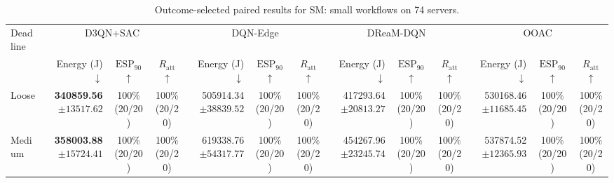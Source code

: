 \begin{table}[!t]
\centering
\caption{Outcome-selected paired results for SM: small workflows on 74 servers.}
\label{tab:conditional_case_sm}
\begingroup
\footnotesize
\setlength{\tabcolsep}{2.2pt}
\renewcommand{\arraystretch}{1.08}
\begin{tabular}{@{}l*{4}{rcc}@{}}
\toprule
Deadline & \multicolumn{3}{c}{D3QN+SAC} & \multicolumn{3}{c}{DQN-Edge} & \multicolumn{3}{c}{DReaM-DQN} & \multicolumn{3}{c}{OOAC} \\
\cmidrule(lr){2-4}\cmidrule(lr){5-7}\cmidrule(lr){8-10}\cmidrule(lr){11-13}
 & Energy (J) $\downarrow$ & $\mathrm{ESP}_{90}$ $\uparrow$ & $R_{\mathrm{att}}$ $\uparrow$ & Energy (J) $\downarrow$ & $\mathrm{ESP}_{90}$ $\uparrow$ & $R_{\mathrm{att}}$ $\uparrow$ & Energy (J) $\downarrow$ & $\mathrm{ESP}_{90}$ $\uparrow$ & $R_{\mathrm{att}}$ $\uparrow$ & Energy (J) $\downarrow$ & $\mathrm{ESP}_{90}$ $\uparrow$ & $R_{\mathrm{att}}$ $\uparrow$ \\
\midrule
Loose & \shortstack[r]{\textbf{340859.56}\\$\pm 13517.62$} & \shortstack[c]{100\%\\(20/20)} & \shortstack[c]{100\%\\(20/20)} & \shortstack[r]{505914.34\\$\pm 38839.52$} & \shortstack[c]{100\%\\(20/20)} & \shortstack[c]{100\%\\(20/20)} & \shortstack[r]{417293.64\\$\pm 20813.27$} & \shortstack[c]{100\%\\(20/20)} & \shortstack[c]{100\%\\(20/20)} & \shortstack[r]{530168.46\\$\pm 11685.45$} & \shortstack[c]{100\%\\(20/20)} & \shortstack[c]{100\%\\(20/20)} \\
Medium & \shortstack[r]{\textbf{358003.88}\\$\pm 15724.41$} & \shortstack[c]{100\%\\(20/20)} & \shortstack[c]{100\%\\(20/20)} & \shortstack[r]{619338.76\\$\pm 54317.77$} & \shortstack[c]{100\%\\(20/20)} & \shortstack[c]{100\%\\(20/20)} & \shortstack[r]{454267.96\\$\pm 23245.74$} & \shortstack[c]{100\%\\(20/20)} & \shortstack[c]{100\%\\(20/20)} & \shortstack[r]{537874.52\\$\pm 12365.93$} & \shortstack[c]{100\%\\(20/20)} & \shortstack[c]{100\%\\(20/20)} \\

\end{tabular}
\end{table}
